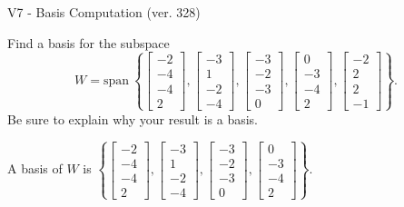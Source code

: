 \begin{exercise}
  \begin{exerciseTitle}V7 - Basis Computation (ver. 328)\end{exerciseTitle}
  \begin{exerciseStatement}
    Find a basis for the subspace 
\[W=\mathrm{span}\ \left\{\left[\begin{array}{r}
-2 \\
-4 \\
-4 \\
2
\end{array}\right] , \left[\begin{array}{r}
-3 \\
1 \\
-2 \\
-4
\end{array}\right] , \left[\begin{array}{r}
-3 \\
-2 \\
-3 \\
0
\end{array}\right] , \left[\begin{array}{r}
0 \\
-3 \\
-4 \\
2
\end{array}\right] , \left[\begin{array}{r}
-2 \\
2 \\
2 \\
-1
\end{array}\right]\right\}.\]
 Be sure to explain why your result is a basis.


  \end{exerciseStatement}
  \begin{exerciseAnswer}
   A basis of \(W\) is  \(\left\{\left[\begin{array}{r}
-2 \\
-4 \\
-4 \\
2
\end{array}\right] , \left[\begin{array}{r}
-3 \\
1 \\
-2 \\
-4
\end{array}\right] , \left[\begin{array}{r}
-3 \\
-2 \\
-3 \\
0
\end{array}\right] , \left[\begin{array}{r}
0 \\
-3 \\
-4 \\
2
\end{array}\right]\right\}\).
  


  \end{exerciseAnswer}
\end{exercise}